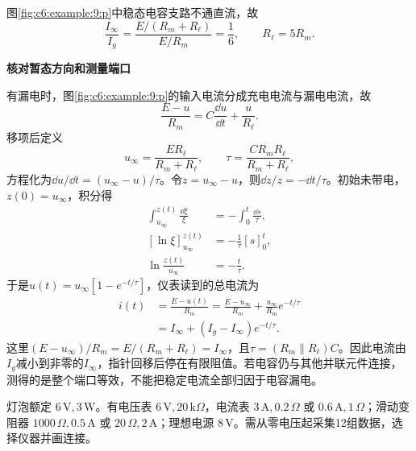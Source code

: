 \begin{solution}
图\ref{fig:c6:example:9:p}中稳态电容支路不通直流，故
\[
\frac{I_\infty}{I_g}=\frac{E/(R_m+R_\ell)}{E/R_m}=\frac16,
\qquad R_\ell=5R_m.
\]


\par\medskip{}\noindent\textbf{核对暂态方向和测量端口}\par\nobreak

有漏电时，图\ref{fig:c6:example:9:p}的输入电流分成充电电流与漏电电流，故
\[
\frac{E-u}{R_m}=C\frac{\dd u}{\dd t}+\frac{u}{R_\ell}.
\]
移项后定义
\[
u_\infty=\frac{ER_\ell}{R_m+R_\ell},\qquad
\tau=\frac{CR_mR_\ell}{R_m+R_\ell},
\]
方程化为$\dd u/\dd t=(u_\infty-u)/\tau$。令$z=u_\infty-u$，则$\dd z/z=-\dd t/\tau$。初始未带电，$z(0)=u_\infty$，积分得
\[
\begin{aligned}
\int_{u_\infty}^{z(t)}\frac{\dd \xi}{\xi}&=-\int_0^t\frac{\dd s}{\tau},\\
[\ln\xi]_{u_\infty}^{z(t)}&=-\frac1\tau[s]_0^t,\\
\ln\frac{z(t)}{u_\infty}&=-\frac t\tau.
\end{aligned}
\]
于是$u(t)=u_\infty[1-e^{-t/\tau}]$，仪表读到的总电流为
\begin{align*}
i(t)&=\frac{E-u(t)}{R_m}
=\frac{E-u_\infty}{R_m}+\frac{u_\infty}{R_m}e^{-t/\tau}\\
&=I_\infty+(I_g-I_\infty)e^{-t/\tau}.
\end{align*}
这里$(E-u_\infty)/R_m=E/(R_m+R_\ell)=I_\infty$，且$\tau=(R_m\parallel R_\ell)C$。因此电流由$I_g$减小到非零的$I_\infty$，指针回移后停在有限阻值。若电容仍与其他并联元件连接，测得的是整个端口等效，不能把稳定电流全部归因于电容漏电。
\end{solution}
\begin{question}\begin{example}[六伏三瓦灯泡的伏安实验]\label{c6:example:10}
灯泡额定 $6\,\mathrm V,3\,\mathrm W$。有电压表 $6\,\mathrm V,20\,\mathrm{k}\Omega$，电流表 $3\,\mathrm A,0.2\,\Omega$ 或 $0.6\,\mathrm A,1\,\Omega$；滑动变阻器 $1000\,\Omega,0.5\,\mathrm A$ 或 $20\,\Omega,2\,\mathrm A$；理想电源 $8\,\mathrm V$。需从零电压起采集12组数据，选择仪器并画连接。
\end{example}
\end{question}
